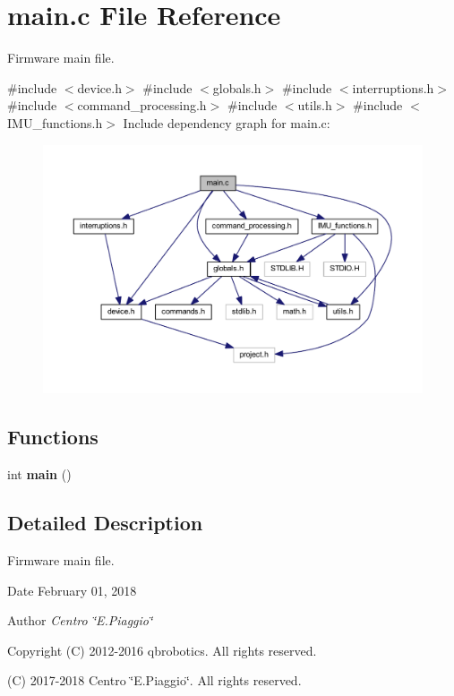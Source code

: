 \section{main.\+c File Reference}
\label{main_8c}


Firmware main file.  


{\ttfamily \#include $<$device.\+h$>$}\newline
{\ttfamily \#include $<$globals.\+h$>$}\newline
{\ttfamily \#include $<$interruptions.\+h$>$}\newline
{\ttfamily \#include $<$command\+\_\+processing.\+h$>$}\newline
{\ttfamily \#include $<$utils.\+h$>$}\newline
{\ttfamily \#include $<$I\+M\+U\+\_\+functions.\+h$>$}\newline
Include dependency graph for main.\+c\+:
\nopagebreak
\begin{figure}[H]
\begin{center}
\leavevmode
\includegraphics[width=350pt]{main_8c__incl}
\end{center}
\end{figure}
\subsection*{Functions}
\begin{DoxyCompactItemize}
\item 
\mbox{\label{main_8c_ae66f6b31b5ad750f1fe042a706a4e3d4}} 
int {\bfseries main} ()
\end{DoxyCompactItemize}


\subsection{Detailed Description}
Firmware main file. 

\begin{DoxyDate}{Date}
February 01, 2018 
\end{DoxyDate}
\begin{DoxyAuthor}{Author}
{\itshape Centro \char`\"{}\+E.\+Piaggio\char`\"{}} 
\end{DoxyAuthor}
\begin{DoxyCopyright}{Copyright}
(C) 2012-\/2016 qbrobotics. All rights reserved. 

(C) 2017-\/2018 Centro \char`\"{}\+E.\+Piaggio\char`\"{}. All rights reserved. 
\end{DoxyCopyright}
